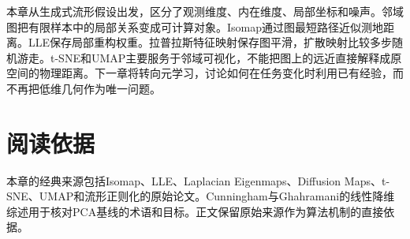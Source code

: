 本章从生成式流形假设出发，区分了观测维度、内在维度、局部坐标和噪声。邻域图把有限样本中的局部关系变成可计算对象。Isomap通过图最短路径近似测地距离。LLE保存局部重构权重。拉普拉斯特征映射保存图平滑，扩散映射比较多步随机游走。t-SNE和UMAP主要服务于邻域可视化，不能把图上的远近直接解释成原空间的物理距离。下一章将转向元学习，讨论如何在任务变化时利用已有经验，而不再把低维几何作为唯一问题。

\section*{阅读依据}
本章的经典来源包括Isomap、LLE、Laplacian Eigenmaps、Diffusion Maps、t-SNE、UMAP和流形正则化的原始论文\cite{tenenbaum2000isomap,roweis2000lle,belkin2003laplacian,coifman2006diffusion,vandermaaten2008tsne,mcinnes2018umap,belkin2006regularization}。Cunningham与Ghahramani的线性降维综述用于核对PCA基线的术语和目标。正文保留原始来源作为算法机制的直接依据。
